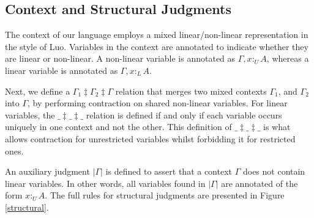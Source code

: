 \documentclass[sigplan,screen,review,authordraft]{acmart}
\theoremstyle{definition}
\newcommand{\pure}[1]{|#1|}
\newcommand{\utype}{:_{\scriptscriptstyle U}}
\newcommand{\ltype}{:_{\scriptscriptstyle L}}
\newcommand{\mrg}[3]{#1\ddagger#2\ddagger#3}
\begin{document}
  \subsection{Context and Structural Judgments}
  The context of our language employs a mixed linear/non-linear representation in the style of Luo\cite{luo}. Variables in the context are annotated to indicate whether they are linear or non-linear. A non-linear variable is annotated as $\Gamma, x \utype A$, whereas a linear variable is annotated as $\Gamma, x \ltype A$. 
  
  Next, we define a $\mrg{\Gamma_1}{\Gamma_2}{\Gamma}$ relation that merges two mixed contexts $\Gamma_1$, and $\Gamma_2$ into $\Gamma$, by performing contraction on shared non-linear variables. For linear variables, the $\mrg{\_}{\_}{\_}$ relation is defined if and only if each variable occurs uniquely in one context and not the other. This definition of $\mrg{\_}{\_}{\_}$ is what allows contraction for unrestricted variables whilst forbidding it for restricted ones.

  An auxiliary judgment $\pure{\Gamma}$ is defined to assert that a context $\Gamma$ does not contain linear variables. In other words, all variables found in $\pure{\Gamma}$ are annotated of the form $x \utype A$. The full rules for structural judgments are presented in Figure \ref{structural}.
  
\end{document}
